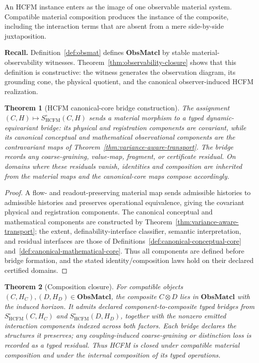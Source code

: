 \documentclass[11pt]{article}
\newtheorem{theorem}{Theorem}
\theoremstyle{definition}
\newcommand{\ObsMatcl}{\mathbf{ObsMatcl}}
\begin{document}
An HCFM instance enters as the image of one observable material system. Compatible material composition produces the instance of the composite, including the interaction terms that are absent from a mere side-by-side juxtaposition.

\noindent\textbf{Recall.}
Definition~\ref{def:obsmat} defines \(\ObsMatcl\) by stable
material-observability witnesses. Theorem~\ref{thm:observability-closure}
shows that this definition is constructive: the witness generates the
observation diagram, its grounding cone, the physical quotient, and the
canonical observer-induced HCFM realization.

\begin{theorem}[HCFM canonical-core bridge construction]
\label{thm:hcfm-canonical-core-bridge}
The assignment $(C, H) \mapsto S^{\circ}_{\mathrm{HCFM}}(C, H)$ sends a material morphism to a typed dynamic-equivariant bridge: its physical and registration components are covariant, while its canonical conceptual and mathematical observational components are the contravariant maps of Theorem~\ref{thm:variance-aware-transport}. The bridge records any coarse-graining, value-map, fragment, or certificate residual. On domains where these residuals vanish, identities and composition are inherited from the material maps and the canonical-core maps compose accordingly.
\end{theorem}

\begin{proof}
A flow- and readout-preserving material map sends admissible histories to admissible histories and preserves operational equivalence, giving the covariant physical and registration components. The canonical conceptual and mathematical components are constructed by Theorem~\ref{thm:variance-aware-transport}; the extent, definability-interface classifier, semantic interpretation, and residual interfaces are those of Definitions~\ref{def:canonical-conceptual-core} and~\ref{def:canonical-mathematical-core}. Thus all components are defined before bridge formation, and the stated identity/composition laws hold on their declared certified domains.
\end{proof}

\begin{theorem}[Composition closure]
\label{thm:composition-closure}
For compatible objects \((C,H_C),(D,H_D)\in\ObsMatcl\), the composite
\(C\otimes D\) lies in \(\ObsMatcl\) with the induced horizon. It admits
declared component-to-composite typed bridges from
\(S^{\circ}_{\mathrm{HCFM}}(C,H_C)\) and
\(S^{\circ}_{\mathrm{HCFM}}(D,H_D)\), together with the nonzero emitted
interaction components indexed across both factors. Each bridge declares the
structures it preserves; any coupling-induced coarse-graining or distinction
loss is recorded as a typed residual. Thus HCFM is closed under compatible
material composition and under the internal composition of its typed
operations.
\end{theorem}
\end{document}
